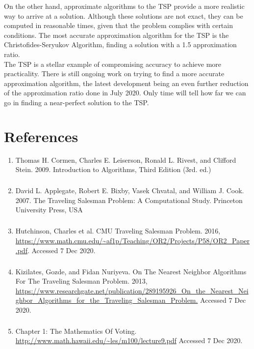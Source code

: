 \documentclass[12pt]{report}
\begin{document}
On the other hand, approximate algorithms to the TSP provide a more realistic way to arrive at a solution. Although these solutions are not exact, they can be computed in reasonable times, given that the problem complies with certain conditions. The most accurate approximation algorithm for the TSP is the Christofides-Seryukov Algorithm, finding a solution with a 1.5 approximation ratio. \\

The TSP is a stellar example of compromising accuracy to achieve more practicality. There is still ongoing work on trying to find a more accurate approximation algorithm, the latest development being an even further reduction of the approximation ratio done in July 2020. Only time will tell how far we can go in finding a near-perfect solution to the TSP.  
\newpage
\chapter{References}
\begin{enumerate}
  \item Thomas H. Cormen, Charles E. Leiserson, Ronald L. Rivest, and Clifford Stein. 2009. Introduction to Algorithms, Third Edition (3rd. ed.)
  \paragraph{}

  \item David L. Applegate, Robert E. Bixby, Vasek Chvatal, and William J. Cook. 2007. The Traveling Salesman Problem: A Computational Study. Princeton University Press, USA
  \paragraph{}
  \item Hutchinson, Charles et al. CMU Traveling Salesman Problem. 2016, \url{https://www.math.cmu.edu/~af1p/Teaching/OR2/Projects/P58/OR2_Paper.pdf}. Accessed 7 Dec 2020.
  \paragraph{}
  \item Kizilates, Gozde, and Fidan Nuriyeva. On The Nearest Neighbor Algorithms For The Traveling Salesman Problem. 2013, \url{https://www.researchgate.net/publication/289195926_On_the_Nearest_Neighbor_Algorithms_for_the_Traveling_Salesman_Problem.} Accessed 7 Dec 2020.
  \paragraph{}
  \item Chapter 1: The Mathematics Of Voting. \url{http://www.math.hawaii.edu/~les/m100/lecture9.pdf} Accessed 7 Dec 2020.
\end{enumerate}
\newpage
\end{document}
